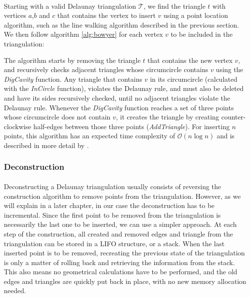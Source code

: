 \paragraph{}
Starting with a valid Delaunay triangulation $\mathcal{T}$, we find the triangle $t$ with vertices $a$,$b$ and $c$ that contains the vertex to insert $v$ using a point location algorithm, such as the line walking algorithm described in the previous section. We then follow algorithm \ref{alg:bowyer} for each vertex $v$ to be included in the triangulation:

\noindent 
The algorithm starts by removing the triangle $t$ that contains the new vertex $v$, and recursively checks adjacent triangles whose circumcircle contains $v$ using the \emph{DigCavity} function. Any triangle that contains $v$ in its circumcircle (calculated with the \emph{InCircle} function), violates the Delaunay rule, and must also be deleted and have its sides recursively checked, until no adjacent triangles violate the Delaunay rule. Whenever the \emph{DigCavity} function reaches a set of three points whose circumcircle does not contain $v$, it creates the triangle by creating counter-clockwise half-edges between those three points (\emph{AddTriangle}). For inserting $n$ points, this algorithm has an expected time complexity of $\mathcal{O}(n \log n)$ and is described in more detail by \citet{tricomplex}.

\subsubsection*{Deconstruction}
\paragraph{}
Deconstructing a Delaunay triangulation usually consists of reversing the construction algorithm to remove points from the triangulation. However, as we will explain in a later chapter, in our case the deconstruction has to be incremental. Since the first point to be removed from the triangulation is necessarily the last one to be inserted, we can use a simpler approach. 
At each step of the construction, all created and removed edges and triangle from the triangulation can be stored in a LIFO structure, or a stack. When the last inserted point is to be removed, recreating the previous state of the triangulation is only a matter of rolling back and retrieving the information from the stack. This also means no geometrical calculations have to be performed, and the old edges and triangles are quickly put back in place, with no new memory allocation needed.
